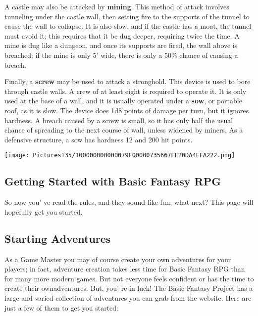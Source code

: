 \documentclass[a4paper,twoside,openany,10pt]{book}
\begin{document}
\begin{multicols}{2}
A castle may also be attacked by \textbf{mining}. This method of attack involves tunneling under the castle wall, then setting fire to the supports of the tunnel to cause the wall to collapse. It is also slow, and if the castle has a moat, the tunnel must avoid it; this requires that it be dug deeper, requiring twice the time. A mine is dug like a dungeon, and once its supports are fired, the wall above is breached; if the mine is only 5' wide, there is only a 50\% chance of causing a breach.

Finally, a \textbf{screw} may be used to attack a stronghold. This device is used to bore through castle walls. A crew of at least eight is required to operate it. It is only used at the base of a wall, and it is usually operated under a \textbf{sow}, or portable roof, as it is slow. The device does 1d8 points of damage per turn, but it ignores hardness. A breach caused by a screw is small, so it has only half the usual chance of spreading to the next course of wall, unless widened by miners. As a defensive structure, a sow has hardness 12 and 200 hit points. 
\end{multicols}

\pagebreak

\begin{center}
	\texttt{[image: Pictures135/100000000000079E00000735667EF20DA4FFA222.png]} 
\end{center}

\pagebreak

\subsection{Getting Started with Basic Fantasy RPG}\label{getting-started-with-basic-fantasy-rpg}

So now you' ve read the rules, and they sound like fun;
what next? This page will hopefully get you started.

\subsection{Starting Adventures}\label{starting-adventures}

As a Game Master you may of course create your own adventures for your players; in fact, adventure creation takes less time for Basic Fantasy RPG than for many more modern games. But not everyone feels confident or has the time to create their ownadventures. But, you' re  in luck! The Basic Fantasy Project has a large and varied collection of adventures you can grab from the website. Here are just a few of them to get you started:
\end{document}
